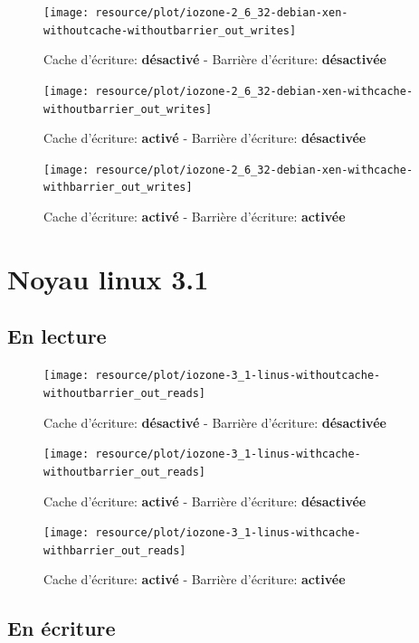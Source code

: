 \begin{figure}[H]
	\centering
	\texttt{[image: resource/plot/iozone-2\_6\_32-debian-xen-withoutcache-withoutbarrier\_out\_writes]}
	\caption{Cache d'écriture: \textbf{désactivé}   -   Barrière d'écriture: \textbf{désactivée}}
\end{figure}

\begin{figure}[H]
	\centering
	\texttt{[image: resource/plot/iozone-2\_6\_32-debian-xen-withcache-withoutbarrier\_out\_writes]}
	\caption{Cache d'écriture: \textbf{activé}   -   Barrière d'écriture: \textbf{désactivée}}
\end{figure}

\begin{figure}[H]
	\centering
	\texttt{[image: resource/plot/iozone-2\_6\_32-debian-xen-withcache-withbarrier\_out\_writes]}
	\caption{Cache d'écriture: \textbf{activé}   -   Barrière d'écriture: \textbf{activée}}
\end{figure}

\section{Noyau linux 3.1}

\subsection*{En lecture}

\begin{figure}[H]
	\centering
	\texttt{[image: resource/plot/iozone-3\_1-linus-withoutcache-withoutbarrier\_out\_reads]}
	\caption{Cache d'écriture: \textbf{désactivé}   -   Barrière d'écriture: \textbf{désactivée}}
\end{figure}

\begin{figure}[H]
	\centering
	\texttt{[image: resource/plot/iozone-3\_1-linus-withcache-withoutbarrier\_out\_reads]}
	\caption{Cache d'écriture: \textbf{activé}   -   Barrière d'écriture: \textbf{désactivée}}
\end{figure}

\begin{figure}[H]
	\centering
	\texttt{[image: resource/plot/iozone-3\_1-linus-withcache-withbarrier\_out\_reads]}
	\caption{Cache d'écriture: \textbf{activé}   -   Barrière d'écriture: \textbf{activée}}
\end{figure}

\subsection*{En écriture}

